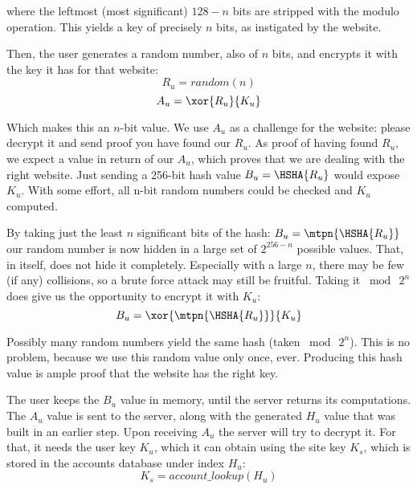 where the leftmost (most significant) $128 - n$ bits are stripped with the modulo operation.
This yields a key of precisely $n$ bits, as instigated by the website.
\par
Then, the user generates a random number, also of \(n\) bits, and encrypts it with the key it has for that website:
\begin{equation}\label{rud:uru}
R_u = random(n)
\end{equation}
\begin{equation}\label{rud:au}
A_u = \xor{R_u}{K_u}
\end{equation}
\par
Which makes this an \(n\)-bit value.
We use \(A_u\) as a challenge for the website: please decrypt it and send proof you have found our \(R_u\).
As proof of having found \(R_u\), we expect a value in return of our \(A_u\), which proves that we are dealing with the right website.
Just sending a 256-bit hash value
\(B_u = \HSHA{R_u}\)
would expose \(K_u\).
With some effort, all n-bit random numbers could be checked and \(K_u\) computed.
\par
By taking just the least \(n\) significant bits of the hash:
\(B_u = \mtpn{\HSHA{R_u}}\)
our random number is now hidden in a large set of \(2^{256-n}\) possible values.
That, in itself, does not hide it completely.
Especially with a large \(n\), there may be few (if any) collisions, so a brute force attack may still be fruitful.
Taking it \(\bmod\ 2^n\) does give us the opportunity to encrypt it with \(K_u\):
\begin{equation}\label{rud:bu}
B_u = \xor{\mtpn{\HSHA{R_u}}}{K_u}
\end{equation}
\par
Possibly many random numbers yield the same hash (taken \(\bmod\ 2^n\)).
This is no problem, because we use this random value only once, ever.
Producing this hash value is ample proof that the website has the right key.
\par
The user keeps the \(B_u\) value in memory, until the server returns its computations.
The \(A_u\) value is sent to the server, along with the generated \(H_u\) value that was built in an earlier step.
Upon receiving \(A_u\) the server will try to decrypt it.
For that, it needs the user key \(K_u\), which it can obtain using the site key \(K_s\), which is stored in the accounts database under index \(H_u\):
\begin{equation}
K_s = account\_lookup(H_u)
\end{equation}
